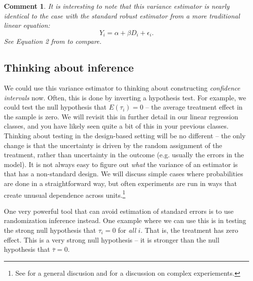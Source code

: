 \documentclass{tufte-handout}
\theoremstyle{break}
\newtheorem{cmt}{Comment}
\begin{document}
\begin{boxF}
  \begin{cmt}
    It is interesting to note that this variance estimator is nearly identical to the case with the standard robust estimator from a more traditional linear equation:
    \begin{equation*}
      Y_{i} = \alpha + \beta D_{i} + \epsilon_{i}.
    \end{equation*}
    See Equation 2 from \citet{imbens2016robust} to compare. 
  \end{cmt}
\end{boxF}

\subsection{Thinking about inference}
We could use this variance estimator to thinking about constructing \emph{confidence intervals} now. Often, this is done by inverting a hypothesis test. For example, we could test the null hypothesis that $E(\tau_{i}) = 0$ -- the average treatment effect in the sample is zero. We will revisit this in further detail in our linear regression classes, and you have likely seen quite a bit of this in your previous classes. Thinking about testing in the design-based setting will be no different -- the only change is that the uncertainty is driven by the random assignment of the treatment, rather than uncertainty in the outcome (e.g. usually the errors in the model). It is not always easy to figure out \emph{what} the variance of an estimator is that has a non-standard design. We will discuss simple cases where probabilities are done in a straightforward way, but often experiments are run in ways that create unusual dependence across units.\footnote{See \citet{imbens2015causal} for a general discusion and \citet{chang2023design} for a discussion on complex experiements.}

One very powerful tool that can avoid estimation of standard errors is to use randomization inference instead. One example where we can use this is in testing the strong null hypothesis that $\tau_{i} = 0$ for \emph{all} $i$. That is, the treatment has zero effect. This is a very strong null hypothesis -- it is stronger than the null hypothesis that $\bar{\tau} = 0$. 
\end{document}
